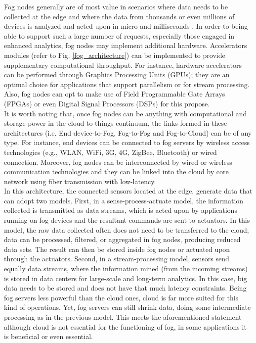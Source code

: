 \noindent\tab Fog nodes generally are of most value in scenarios where data needs to be collected at the edge and where the data from thousands or even millions of devices is analyzed and acted upon in micro and milliseconds \cite{openfog2017openfog}. In order to being able to support such a large number of requests, especially those engaged in enhanced analytics, fog nodes may implement additional hardware. Accelerators modules (refer to Fig. \ref{fog_architecture}) can be implemented to provide supplementary computational throughput. For instance, hardware accelerators can be performed through Graphics Processing Units (GPUs); they are an optimal choice for applications that support parallelism or for stream processing. Also, fog nodes can opt to make use of Field Programmable Gate Arrays (FPGAs) or even Digital Signal Processors (DSPs) for this propose.\\
\noindent\tab It is worth noting that, once fog nodes can be anything with computational and storage power in the cloud-to-things continuum, the links formed in these architectures (i.e. End device-to-Fog, Fog-to-Fog and Fog-to-Cloud) can be of any type. For instance, end devices can be connected to fog servers by wireless access technologies (e.g., WLAN, WiFi, 3G, 4G, ZigBee, Bluetooth) or wired connection. Moreover, fog nodes can be interconnected by wired or wireless communication technologies and they can be linked into the cloud by core network using fiber transmission with low-latency.\\
\noindent\tab In this architecture, the connected sensors located at the edge, generate data that can adopt two models. First, in a sense-process-actuate model, the information collected is transmitted as data streams, which is acted upon by applications running on fog devices and the resultant commands are sent to actuators. In this model, the raw data collected often does not need to be transferred to the cloud; data can be processed, filtered, or aggregated in fog nodes, producing reduced data sets. The result can then be stored inside fog nodes or actuated upon through the actuators. Second, in a stream-processing model, sensors send equally data streams, where the information mined (from the incoming streams) is stored in data centers for large-scale and long-term analytics. In this case, big data needs to be stored and does not have that much latency constraints. Being fog servers less powerful than the cloud ones, cloud is far more suited for this kind of operations. Yet, fog servers can still shrink data, doing some intermediate processing as in the previous model. This meets the aforementioned statement - although cloud is not essential for the functioning of fog, in some applications it is beneficial or even essential.\\
